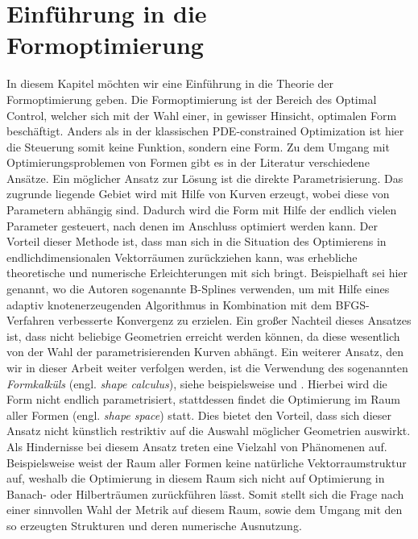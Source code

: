 


\section{Einführung in die Formoptimierung}

In diesem Kapitel möchten wir eine Einführung in die Theorie der Formoptimierung geben.
Die Formoptimierung ist der Bereich des Optimal Control, welcher sich mit der Wahl einer, in gewisser Hinsicht, optimalen Form beschäftigt. Anders als in der klassischen PDE-constrained Optimization ist hier die Steuerung somit keine Funktion, sondern eine Form.
Zu dem Umgang mit Optimierungsproblemen von Formen gibt es in der Literatur verschiedene Ansätze. \newline
Ein möglicher Ansatz zur Lösung ist die direkte Parametrisierung. Das zugrunde liegende Gebiet wird mit Hilfe von Kurven erzeugt, wobei diese von Parametern abhängig sind. Dadurch wird die Form mit Hilfe der endlich vielen Parameter gesteuert, nach denen im Anschluss optimiert werden kann. Der Vorteil dieser Methode ist, dass man sich in die Situation des Optimierens in endlichdimensionalen Vektorräumen zurückziehen kann, was erhebliche theoretische und numerische Erleichterungen mit sich bringt. Beispielhaft sei hier \cite{b-spline} genannt, wo die Autoren sogenannte B-Splines verwenden, um mit Hilfe eines adaptiv knotenerzeugenden Algorithmus in Kombination mit dem BFGS-Verfahren verbesserte Konvergenz zu erzielen. Ein großer Nachteil dieses Ansatzes ist, dass nicht beliebige Geometrien erreicht werden können, da diese wesentlich von der Wahl der parametrisierenden Kurven abhängt. \newline
Ein weiterer Ansatz, den wir in dieser Arbeit weiter verfolgen werden, ist die Verwendung des sogenannten \textit{Formkalküls} (engl. \textit{shape calculus}), siehe beispielsweise \cite{Shape_diff} und \cite{shapeopt}. Hierbei wird die Form nicht endlich parametrisiert, stattdessen findet die Optimierung im Raum aller Formen (engl. \textit{shape space}) statt. Dies bietet den Vorteil, dass sich dieser Ansatz nicht künstlich restriktiv auf die Auswahl möglicher Geometrien auswirkt. Als Hindernisse bei diesem Ansatz treten eine Vielzahl von Phänomenen auf. Beispielsweise weist der Raum aller Formen keine natürliche Vektorraumstruktur auf, weshalb die Optimierung in diesem Raum sich nicht auf Optimierung in Banach- oder Hilberträumen zurückführen lässt. Somit stellt sich die Frage nach einer sinnvollen Wahl der Metrik auf diesem Raum, sowie dem Umgang mit den so erzeugten Strukturen und deren numerische Ausnutzung.
